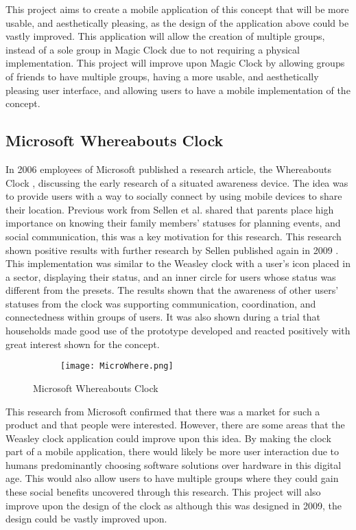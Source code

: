 This project aims to create a mobile application of this concept that will be more usable, and aesthetically pleasing, as the design of the application above could be vastly improved. This application will allow the creation of multiple groups, instead of a sole group in Magic Clock due to not requiring a physical implementation. This project will improve upon Magic Clock by allowing groups of friends to have multiple groups, having a more usable, and aesthetically pleasing user interface, and allowing users to have a mobile implementation of the concept.

\subsection{Microsoft Whereabouts Clock}

In 2006 employees of Microsoft published a research article, the Whereabouts Clock \cite{micrWher}, discussing the early research of a situated awareness device. The idea was to provide users with a way to socially connect by using mobile devices to share their location. Previous work from Sellen et al. \cite{sellen} shared that parents place high importance on knowing their family members' statuses for planning events, and social communication, this was a key motivation for this research. This research shown positive results with further research by Sellen published again in 2009 \cite{sellen2009}. This implementation was similar to the Weasley clock with a user's icon placed in a sector, displaying their status, and an inner circle for users whose status was different from the presets. The results shown that the awareness of other users' statuses from the clock was supporting communication, coordination, and connectedness within groups of users. It was also shown during a trial that households made good use of the prototype developed and reacted positively with great interest shown for the concept.

\begin{figure}[!htbp]
    \centering
    \begin{subfigure}[b]{0.5\textwidth}
        {\texttt{[image: MicroWhere.png]}}
    \end{subfigure}
    \caption{Microsoft Whereabouts Clock}
    \label{fig:microWhere}
\end{figure}
\FloatBarrier

This research from Microsoft confirmed that there was a market for such a product and that people were interested. However, there are some areas that the Weasley clock application could improve upon this idea. By making the clock part of a mobile application, there would likely be more user interaction due to humans predominantly choosing software solutions over hardware in this digital age. This would also allow users to have multiple groups where they could gain these social benefits uncovered through this research. This project will also improve upon the design of the clock as although this was designed in 2009, the design could be vastly improved upon. 



